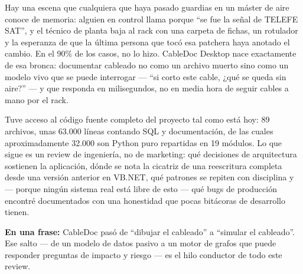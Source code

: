 \documentclass[11pt,twocolumn]{article}
\newcommand{\dropcap}[1]{\lettrine[lines=3,lraise=0.05,nindent=0pt,slope=0pt,findent=2pt]{\headfont\color{BDaccent}#1}{}}
\begin{document}

\thispagestyle{fancy}

\dropcap{H}ay una escena que cualquiera que haya pasado guardias en un máster de aire conoce de memoria: alguien en control llama porque ``se fue la señal de TELEFE SAT'', y el técnico de planta baja al rack con una carpeta de fichas, un rotulador y la esperanza de que la última persona que tocó esa patchera haya anotado el cambio. En el 90\% de los casos, no lo hizo. CableDoc Desktop nace exactamente de esa bronca: documentar cableado no como un archivo muerto sino como un modelo vivo que se puede interrogar --- ``si corto este cable, ¿qué se queda sin aire?'' --- y que responda en milisegundos, no en media hora de seguir cables a mano por el rack.

Tuve acceso al código fuente completo del proyecto tal como está hoy: 89 archivos, unas 63.000 líneas contando SQL y documentación, de las cuales aproximadamente 32.000 son Python puro repartidas en 19 módulos. Lo que sigue es un review de ingeniería, no de marketing: qué decisiones de arquitectura sostienen la aplicación, dónde se nota la cicatriz de una reescritura completa desde una versión anterior en VB.NET, qué patrones se repiten con disciplina y --- porque ningún sistema real está libre de esto --- qué bugs de producción encontré documentados con una honestidad que pocas bitácoras de desarrollo tienen.

\begin{pullquote}
\headfont\textbf{En una frase:} CableDoc pasó de ``dibujar el cableado'' a ``simular el cableado''. Ese salto --- de un modelo de datos pasivo a un motor de grafos que puede responder preguntas de impacto y riesgo --- es el hilo conductor de todo este review.
\end{pullquote}
\end{document}

